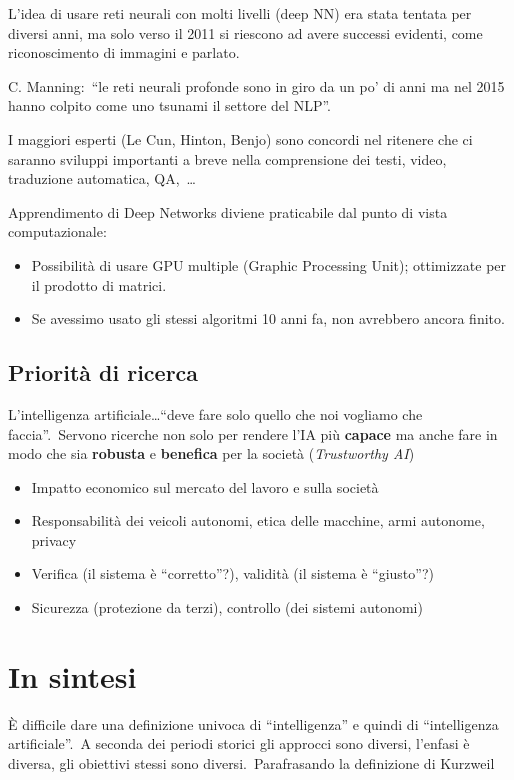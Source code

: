 L'idea di usare reti neurali con molti livelli (deep NN) era stata tentata per diversi anni, ma solo verso il 2011 si riescono ad avere successi evidenti, come riconoscimento di immagini e parlato.

C. Manning:\ ``le reti neurali profonde sono in giro da un po' di anni ma nel 2015 hanno colpito come uno tsunami il settore del NLP''.

I maggiori esperti (Le Cun, Hinton, Benjo) sono concordi nel ritenere che ci saranno sviluppi importanti a breve nella comprensione dei testi, video, traduzione automatica, QA,\ \dots

Apprendimento di Deep Networks diviene praticabile dal punto di vista computazionale:
\begin{itemize}
	\item Possibilità di usare GPU multiple (Graphic Processing Unit); ottimizzate per il prodotto di matrici.
	\item Se avessimo usato gli stessi algoritmi 10 anni fa, non avrebbero ancora finito.
\end{itemize}

\subsection{Priorità di ricerca}
L'intelligenza artificiale\dots ``deve fare solo quello che noi vogliamo che faccia''.\
Servono ricerche non solo per rendere l'IA più \textbf{capace} ma anche fare in modo che sia \textbf{robusta} e \textbf{benefica} per la società (\textit{Trustworthy AI})
\begin{itemize}
	\item Impatto economico sul mercato del lavoro e sulla società
	\item Responsabilità dei veicoli autonomi, etica delle macchine, armi autonome, privacy
	\item Verifica (il sistema è ``corretto''?), validità (il sistema è ``giusto''?)
	\item Sicurezza (protezione da terzi), controllo (dei sistemi autonomi)
\end{itemize}

\section{In sintesi}
È difficile dare una definizione univoca di ``intelligenza'' e quindi di ``intelligenza artificiale''.\
A seconda dei periodi storici gli approcci sono diversi, l'enfasi è diversa, gli obiettivi stessi sono diversi.\
Parafrasando la definizione di Kurzweil

